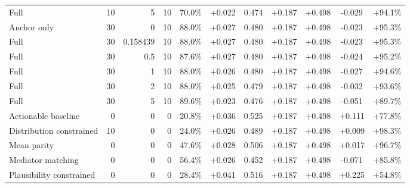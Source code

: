 \begin{table}[htbp]
\begin{tabular}{lrrrccccccc}
Full & 10 & 5 & 10 & 70.0\% & +0.022 & 0.474 & +0.187 & +0.498 & -0.029 & +94.1\% \\
Anchor only & 30 & 0 & 10 & 88.0\% & +0.027 & 0.480 & +0.187 & +0.498 & -0.023 & +95.3\% \\
Full & 30 & 0.158439 & 10 & 88.0\% & +0.027 & 0.480 & +0.187 & +0.498 & -0.023 & +95.3\% \\
Full & 30 & 0.5 & 10 & 87.6\% & +0.027 & 0.480 & +0.187 & +0.498 & -0.024 & +95.2\% \\
Full & 30 & 1 & 10 & 88.0\% & +0.026 & 0.480 & +0.187 & +0.498 & -0.027 & +94.6\% \\
Full & 30 & 2 & 10 & 88.0\% & +0.025 & 0.479 & +0.187 & +0.498 & -0.032 & +93.6\% \\
Full & 30 & 5 & 10 & 89.6\% & +0.023 & 0.476 & +0.187 & +0.498 & -0.051 & +89.7\% \\
Actionable baseline & 0 & 0 & 0 & 20.8\% & +0.036 & 0.525 & +0.187 & +0.498 & +0.111 & +77.8\% \\
Distribution constrained & 10 & 0 & 0 & 24.0\% & +0.026 & 0.489 & +0.187 & +0.498 & +0.009 & +98.3\% \\
Mean parity & 0 & 0 & 0 & 47.6\% & +0.028 & 0.506 & +0.187 & +0.498 & +0.017 & +96.7\% \\
Mediator matching & 0 & 0 & 0 & 56.4\% & +0.026 & 0.452 & +0.187 & +0.498 & -0.071 & +85.8\% \\
Plausibility constrained & 0 & 0 & 0 & 28.4\% & +0.041 & 0.516 & +0.187 & +0.498 & +0.225 & +54.8\% \\
\bottomrule
\end{tabular}
\end{table}
